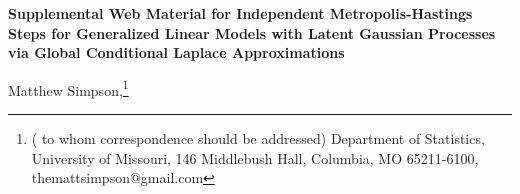 \documentclass[12pt]{article}
\newcommand{\Appendix}
 {%
 \def\thesection{\Alph{section}}
 \def\thesubsection{\Alph{section}.\arabic{subsection}}
 \def\theequation{\Alph{section}.\arabic{equation}}
 \def\thefigure{\Alph{section}.\arabic{figure}}
 \def\thealg{\Alph{section}.\arabic{alg}}
 }
\begin{document}
\thispagestyle{empty} \baselineskip=28pt

\thispagestyle{empty} \baselineskip=28pt

%
\begin{center}
\begin{center}
{\LARGE{\bf Supplemental Web Material for Independent Metropolis-Hastings Steps for Generalized Linear Models with Latent Gaussian Processes via Global Conditional Laplace Approximations}}
\end{center}
\end{center}


\baselineskip=12pt



\vskip 2mm
\blind
{
  \begin{center}
    Matthew Simpson,\footnote{(\baselineskip=10pt to whom correspondence should be addressed)
      Department of Statistics, University of Missouri,
      146 Middlebush Hall, Columbia, MO 65211-6100, themattsimpson@gmail.com}
  \end{center}
} \fi

\clearpage\pagebreak\newpage {}

\baselineskip=24pt

\Appendix
\end{document}
